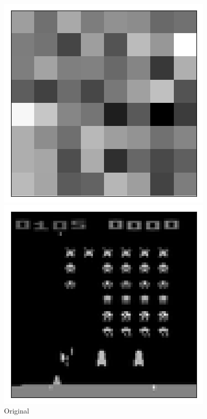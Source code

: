 \begin{figure}[h!]
\begin{multicols}{4}
    \caption{$\beta=4$}
    \includegraphics[scale=0.4]{figures/results/latent_image/beta_16_sample_30_latent.png}
    \caption{$\beta=16$}
\end{multicols}
\begin{multicols}{4}
    \includegraphics[scale=0.4]{figures/results/latent_image/beta_1_sample_90_original.png}
    \caption{Original}

\end{multicols}
\end{figure}
